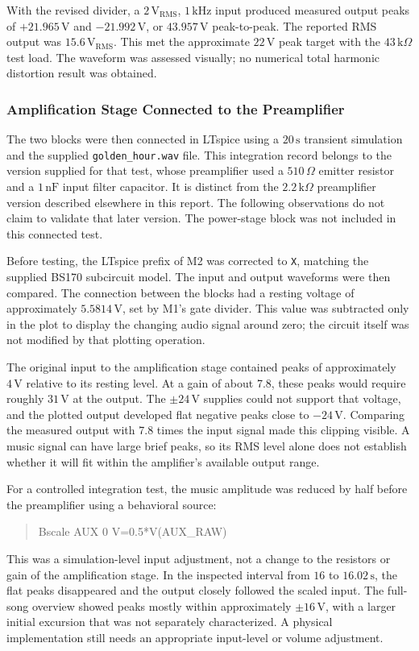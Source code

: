 \documentclass[conference]{IEEEtran}
\begin{document}
With the revised divider, a $2\,\mathrm{V_{RMS}}$, $1\,\mathrm{kHz}$ input produced measured output peaks of $+21.965\,\mathrm{V}$ and $-21.992\,\mathrm{V}$, or $43.957\,\mathrm{V}$ peak-to-peak. The reported RMS output was $15.6\,\mathrm{V_{RMS}}$. This met the approximate $22\,\mathrm{V}$ peak target with the $43\,\mathrm{k}\Omega$ test load. The waveform was assessed visually; no numerical total harmonic distortion result was obtained.

\subsubsection{Amplification Stage Connected to the Preamplifier}
The two blocks were then connected in LTspice using a $20\,\mathrm{s}$ transient simulation and the supplied \texttt{golden\_hour.wav} file. This integration record belongs to the version supplied for that test, whose preamplifier used a $510\,\Omega$ emitter resistor and a $1\,\mathrm{nF}$ input filter capacitor. It is distinct from the $2.2\,\mathrm{k}\Omega$ preamplifier version described elsewhere in this report. The following observations do not claim to validate that later version. The power-stage block was not included in this connected test.

Before testing, the LTspice prefix of M2 was corrected to \texttt{X}, matching the supplied BS170 subcircuit model. The input and output waveforms were then compared. The connection between the blocks had a resting voltage of approximately $5.5814\,\mathrm{V}$, set by M1's gate divider. This value was subtracted only in the plot to display the changing audio signal around zero; the circuit itself was not modified by that plotting operation.

The original input to the amplification stage contained peaks of approximately $4\,\mathrm{V}$ relative to its resting level. At a gain of about 7.8, these peaks would require roughly $31\,\mathrm{V}$ at the output. The $\pm24\,\mathrm{V}$ supplies could not support that voltage, and the plotted output developed flat negative peaks close to $-24\,\mathrm{V}$. Comparing the measured output with 7.8 times the input signal made this clipping visible. A music signal can have large brief peaks, so its RMS level alone does not establish whether it will fit within the amplifier's available output range.

For a controlled integration test, the music amplitude was reduced by half before the preamplifier using a behavioral source:
\begin{quote}
\small\ttfamily
Bscale AUX 0 V=0.5*V(AUX\_RAW)
\end{quote}
This was a simulation-level input adjustment, not a change to the resistors or gain of the amplification stage. In the inspected interval from $16$ to $16.02\,\mathrm{s}$, the flat peaks disappeared and the output closely followed the scaled input. The full-song overview showed peaks mostly within approximately $\pm16\,\mathrm{V}$, with a larger initial excursion that was not separately characterized. A physical implementation still needs an appropriate input-level or volume adjustment.
\end{document}
